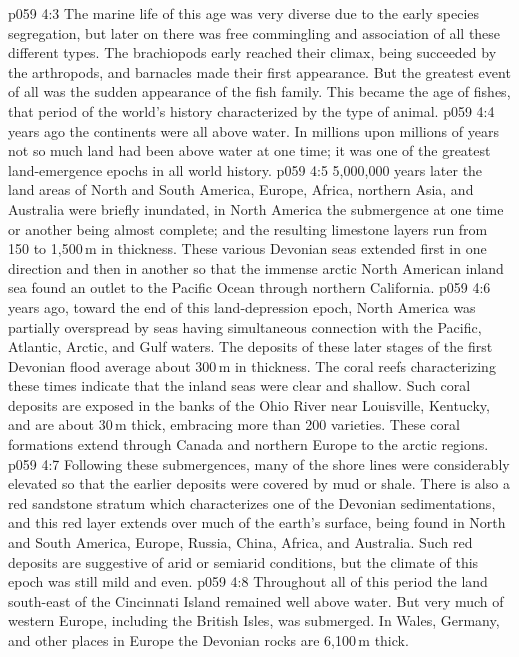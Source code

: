 \vs p059 4:3 The marine life of this age was very diverse due to the early species segregation, but later on there was free commingling and association of all these different types. The brachiopods early reached their climax, being succeeded by the arthropods, and barnacles made their first appearance. But the greatest event of all was the sudden appearance of the fish family. This became the age of fishes, that period of the world’s history characterized by the  type of animal.
\vs p059 4:4 \pc {} years ago the continents were all above water. In millions upon millions of years not so much land had been above water at one time; it was one of the greatest land\hyp{}emergence epochs in all world history.
\vs p059 4:5 5,000,000 years later the land areas of North and South America, Europe, Africa, northern Asia, and Australia were briefly inundated, in North America the submergence at one time or another being almost complete; and the resulting limestone layers run from 150 to 1,500\,m in thickness. These various Devonian seas extended first in one direction and then in another so that the immense arctic North American inland sea found an outlet to the Pacific Ocean through northern California.
\vs p059 4:6 \pc {} years ago, toward the end of this land\hyp{}depression epoch, North America was partially overspread by seas having simultaneous connection with the Pacific, Atlantic, Arctic, and Gulf waters. The deposits of these later stages of the first Devonian flood average about 300\,m in thickness. The coral reefs characterizing these times indicate that the inland seas were clear and shallow. Such coral deposits are exposed in the banks of the Ohio River near Louisville, Kentucky, and are about 30\,m thick, embracing more than 200 varieties. These coral formations extend through Canada and northern Europe to the arctic regions.
\vs p059 4:7 Following these submergences, many of the shore lines were considerably elevated so that the earlier deposits were covered by mud or shale. There is also a red sandstone stratum which characterizes one of the Devonian sedimentations, and this red layer extends over much of the earth’s surface, being found in North and South America, Europe, Russia, China, Africa, and Australia. Such red deposits are suggestive of arid or semiarid conditions, but the climate of this epoch was still mild and even.
\vs p059 4:8 Throughout all of this period the land south\hyp{}east of the Cincinnati Island remained well above water. But very much of western Europe, including the British Isles, was submerged. In Wales, Germany, and other places in Europe the Devonian rocks are 6,100\,m thick.
